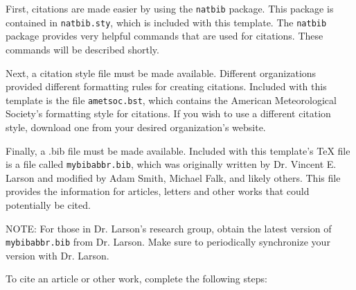 \documentclass[master]{UWMThesis}
\begin{document}
First, citations are made easier by using the \verb=natbib= package.  This package is contained in \verb=natbib.sty=, which is included with this template.  The \verb=natbib= package provides very helpful commands that are used for citations.  These commands will be described shortly.

Next, a citation style file must be made available.  Different organizations provided different formatting rules for creating citations.  Included with this template is the file \verb=ametsoc.bst=, which contains the American Meteorological Society's formatting style for citations.  If you wish to use a different citation style, download one from your desired organization's website.

Finally, a .bib file must be made available.  Included with this template's TeX file is a file called \verb=mybibabbr.bib=, which was originally written by Dr. Vincent E. Larson and modified by Adam Smith, Michael Falk, and likely others.  This file provides the information for articles, letters and other works that could potentially be cited.

NOTE: For those in Dr. Larson's research group, obtain the latest version of \verb=mybibabbr.bib= from Dr. Larson.  Make sure to periodically synchronize your version with Dr. Larson.

To cite an article or other work, complete the following steps:
\end{document}
